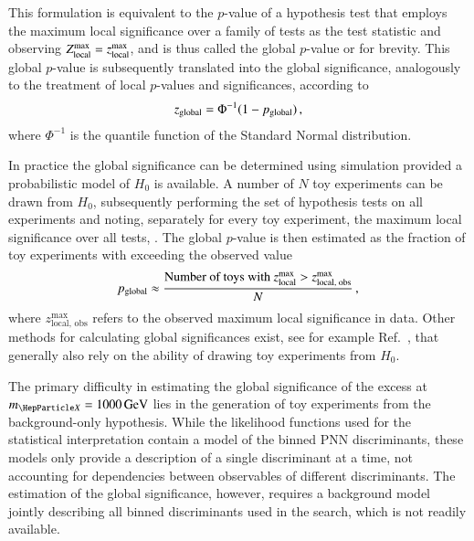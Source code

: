 
This formulation %
is equivalent to the $p$-value of a hypothesis test that employs the maximum
local significance over a family of tests as the test statistic and observing
$Z_{\text{local}}^{\text{max}} = z_{\text{local}}^{\text{max}}$, and is thus called the global $p$-value or \pglobal
for brevity. This global $p$-value is subsequently translated into the global
significance, analogously to the treatment of local $p$-values and
significances, according to
\begin{align*}
  z_{\text{global}} = \Phi^{-1}(1 - p_{\text{global}}) \,\text{,}
\end{align*}
where $\Phi^{-1}$ is the quantile function of the Standard Normal distribution.

In practice the global significance can be determined using simulation provided
a probabilistic model of $H_0$ is available. A number of $N$ toy experiments can
be drawn from $H_0$, subsequently performing the set of hypothesis tests on all
experiments and noting, separately for every toy experiment, the maximum local
significance over all tests, \zmaxlocal. The global $p$-value is then estimated
as the fraction of toy experiments with \zmaxlocal exceeding the observed value
\begin{align*}
  p_{\text{global}} \approx \frac{ \text{Number of toys with } z_{\text{local}}^{\text{max}} > z_{\text{local, obs}}^{\text{max}} }
                        { N } \,\text{,}
\end{align*}
where $z_{\text{local, obs}}^{\text{max}}$ refers to the observed maximum local
significance in data. Other methods for calculating global significances exist,
see for example Ref.~\cite{Gross:2010qma}, that generally also rely on the
ability of drawing toy experiments from $H_0$.

The primary difficulty in estimating the global significance of the excess at
$\mX = \SI{1000}{\GeV}$ lies in the generation of toy experiments from the
background-only hypothesis. While the likelihood functions used for the
statistical interpretation contain a model of the binned PNN discriminants,
these models only provide a description of a single discriminant at a time, not
accounting for dependencies between observables of different discriminants. The
estimation of the global significance, however, requires a background model
jointly describing all binned discriminants used in the search, which is not
readily available.

